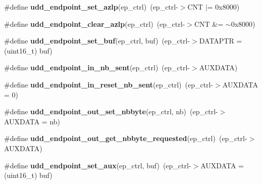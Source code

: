 \begin{DoxyCompactItemize}
\item 
\hypertarget{group__udd__xmega__usb__group_ga170bb9db14024ddf63ca9ec0a28d07c6}{\#define {\bfseries udd\-\_\-endpoint\-\_\-set\-\_\-azlp}(ep\-\_\-ctrl)~(ep\-\_\-ctrl-\/$>$C\-N\-T $|$= 0x8000)}\label{group__udd__xmega__usb__group_ga170bb9db14024ddf63ca9ec0a28d07c6}

\item 
\hypertarget{group__udd__xmega__usb__group_ga7f87cb43d003e6ee11c46d067d80968e}{\#define {\bfseries udd\-\_\-endpoint\-\_\-clear\-\_\-azlp}(ep\-\_\-ctrl)~(ep\-\_\-ctrl-\/$>$C\-N\-T \&= $\sim$0x8000)}\label{group__udd__xmega__usb__group_ga7f87cb43d003e6ee11c46d067d80968e}

\item 
\hypertarget{group__udd__xmega__usb__group_ga714934792b9f0f37b708e101daa3304c}{\#define {\bfseries udd\-\_\-endpoint\-\_\-set\-\_\-buf}(ep\-\_\-ctrl, buf)~(ep\-\_\-ctrl-\/$>$D\-A\-T\-A\-P\-T\-R = (uint16\-\_\-t) buf)}\label{group__udd__xmega__usb__group_ga714934792b9f0f37b708e101daa3304c}

\item 
\hypertarget{group__udd__xmega__usb__group_ga4131567a7cff3a0b166d1f4799649398}{\#define {\bfseries udd\-\_\-endpoint\-\_\-in\-\_\-nb\-\_\-sent}(ep\-\_\-ctrl)~(ep\-\_\-ctrl-\/$>$A\-U\-X\-D\-A\-T\-A)}\label{group__udd__xmega__usb__group_ga4131567a7cff3a0b166d1f4799649398}

\item 
\hypertarget{group__udd__xmega__usb__group_gaaa219301e6462b97ed377affb3c0573d}{\#define {\bfseries udd\-\_\-endpoint\-\_\-in\-\_\-reset\-\_\-nb\-\_\-sent}(ep\-\_\-ctrl)~(ep\-\_\-ctrl-\/$>$A\-U\-X\-D\-A\-T\-A = 0)}\label{group__udd__xmega__usb__group_gaaa219301e6462b97ed377affb3c0573d}

\item 
\hypertarget{group__udd__xmega__usb__group_ga18d557272e3e0892de9e5f638b07be0b}{\#define {\bfseries udd\-\_\-endpoint\-\_\-out\-\_\-set\-\_\-nbbyte}(ep\-\_\-ctrl, nb)~(ep\-\_\-ctrl-\/$>$A\-U\-X\-D\-A\-T\-A = nb)}\label{group__udd__xmega__usb__group_ga18d557272e3e0892de9e5f638b07be0b}

\item 
\hypertarget{group__udd__xmega__usb__group_gac20250b3599a6436868e421a1fbbd98f}{\#define {\bfseries udd\-\_\-endpoint\-\_\-out\-\_\-get\-\_\-nbbyte\-\_\-requested}(ep\-\_\-ctrl)~(ep\-\_\-ctrl-\/$>$A\-U\-X\-D\-A\-T\-A)}\label{group__udd__xmega__usb__group_gac20250b3599a6436868e421a1fbbd98f}

\item 
\hypertarget{group__udd__xmega__usb__group_gab89ae1d905abaed4d224f6bff50d440b}{\#define {\bfseries udd\-\_\-endpoint\-\_\-set\-\_\-aux}(ep\-\_\-ctrl, buf)~(ep\-\_\-ctrl-\/$>$A\-U\-X\-D\-A\-T\-A = (uint16\-\_\-t) buf)}\label{group__udd__xmega__usb__group_gab89ae1d905abaed4d224f6bff50d440b}

\end{DoxyCompactItemize}

